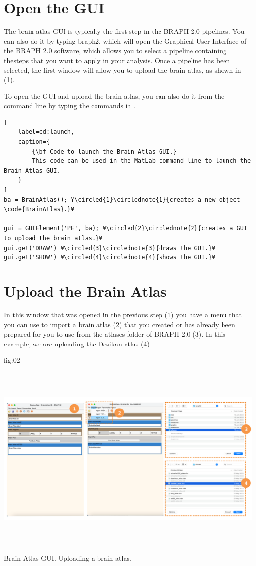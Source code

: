 \documentclass{tufte-handout}
\begin{document}
\clearpage
\section{Open the GUI}

The brain atlas GUI is typically the first step in the BRAPH 2.0 pipelines. You can also do it by typing braph2, which will open the Graphical User Interface of the BRAPH 2.0 software, which allows you to select a pipeline containing thesteps that you want to apply in your analysis. Once a pipeline has been selected, the first window will allow you to upload the brain atlas, as shown in  (1).

To open the GUI and upload the brain atlas, you can also do it from the command line by typing the commands in .
%
\begin{lstlisting}[
	label=cd:launch,
	caption={
		{\bf Code to launch the Brain Atlas GUI.}
		This code can be used in the MatLab command line to launch the  Brain Atlas GUI.
	}
]
ba = BrainAtlas(); ¥\circled{1}\circlednote{1}{creates a new object \code{BrainAtlas}.}¥

gui = GUIElement('PE', ba); ¥\circled{2}\circlednote{2}{creates a GUI to upload the brain atlas.}¥
gui.get('DRAW') ¥\circled{3}\circlednote{3}{draws the GUI.}¥
gui.get('SHOW') ¥\circled{4}\circlednote{4}{shows the GUI.}¥
\end{lstlisting}

	
\clearpage
\section{Upload the Brain Atlas}

In this window that was opened in the previous step (1) you have a menu that you can use to import a brain atlas (2) that you created or has already been prepared for you to use from the atlases folder of BRAPH 2.0 (3). In this example, we are uploading the Desikan atlas (4)  . 


	{fig:02}
	{\includegraphics[height=10cm]{tut_ba/fig3.png}}
	{Brain Atlas GUI.}
	{
	Uploading a brain atlas. 
	}
	
\end{document}
